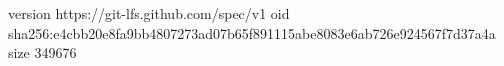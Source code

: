 version https://git-lfs.github.com/spec/v1
oid sha256:e4cbb20e8fa9bb4807273ad07b65f891115abe8083e6ab726e924567f7d37a4a
size 349676
